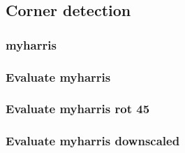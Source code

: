\documentclass[12pt]{article}
\begin{document}
\subsection{Corner detection}
\subsubsection{myharris}
\subsubsection{Evaluate myharris}
\subsubsection{Evaluate myharris rot 45}
\subsubsection{Evaluate myharris downscaled}
\subsubsection{}

\pagebreak
\end{document}
